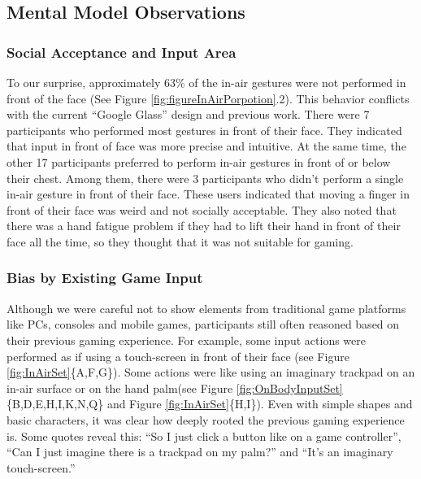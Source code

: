 \documentclass{sigchi}
\begin{document}
  \subsection{Mental Model Observations}
    \subsubsection{Social Acceptance and Input Area}
    To our surprise, approximately 63\% of the in-air gestures were not performed in front of the face (See Figure \ref{fig:figureInAirPorpotion}.2). This behavior conflicts with the current ``Google Glass'' design and previous work\cite{Colaco:2013:MCL:2501988.2502042}. There were 7 participants who performed most gestures in front of their face. They indicated that input in front of face was more precise and intuitive. At the same time, the other 17 participants preferred to perform in-air gestures in front of or below their chest. Among them, there were 3 participants who didn't perform a single in-air gesture in front of their face. These users indicated that moving a finger in front of their face was weird and not socially acceptable. They also noted that there was a hand fatigue problem if they had to lift their hand in front of their face all the time, so they thought that it was not suitable for gaming.

    \subsubsection{Bias by Existing Game Input}
    Although we were careful not to show elements from traditional game platforms like PCs, consoles and mobile games, participants still often reasoned based on their previous gaming experience. For example, some input actions were performed as if using a touch-screen in front of their face (see Figure \ref{fig:InAirSet}\{A,F,G\}). Some actions were like using an imaginary trackpad on an in-air surface or on the hand palm(see Figure \ref{fig:OnBodyInputSet}\{B,D,E,H,I,K,N,Q\} and Figure \ref{fig:InAirSet}\{H,I\}). Even with simple shapes and basic characters, it was clear how deeply rooted the previous gaming experience is. Some quotes reveal this: ``So I just click a button like on a game controller'', ``Can I just imagine there is a trackpad on my palm?'' and ``It's an imaginary touch-screen.''
\end{document}
